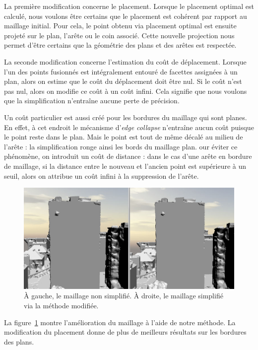 \documentclass[12pt, twoside]{article}
\begin{document}
La première modification concerne le placement. Lorsque le placement optimal est calculé, nous voulons être certains que le placement est cohérent par rapport au maillage initial. Pour cela, le point obtenu via placement optimal est ensuite projeté sur le plan, l'arête ou le coin associé. Cette nouvelle projection nous permet d'être certains que la géométrie des plans et des arêtes est respectée.

La seconde modification concerne l'estimation du coût de déplacement. Lorsque l'un des points fusionnés est intégralement entouré de facettes assignées à un plan, alors on estime que le coût du déplacement doit être nul. Si le coût n'est pas nul, alors on modifie ce coût à un coût infini. Cela signifie que nous voulons que la simplification n'entraîne aucune perte de précision.

Un coût particulier est aussi créé pour les bordures du maillage qui sont planes. En effet, à cet endroit le mécanisme d'\textit{edge collapse} n'entraîne aucun coût puisque le point reste dans le plan. Mais le point est tout de même décalé au milieu de l'arête : la simplification ronge ainsi les bords du maillage plan. our éviter ce phénomène, on introduit un coût de distance : dans le cas d'une arête en bordure de maillage, si la distance entre le nouveau et l'ancien point est supérieure à un seuil, alors on attribue un coût infini à la suppression de l'arête.

\begin{figure}[h]
\centering
\includegraphics[scale=0.33]{Simpli2.png}
\caption{\label{fig:simpl2} À gauche, le maillage non simplifié. À droite, le maillage simplifié via la méthode modifiée.}
\end{figure}

La figure~\ref{fig:simpl2} montre l'amélioration du maillage à l'aide de notre méthode. La modification du placement donne de plus de meilleurs résultats sur les bordures des plans.
\end{document}
